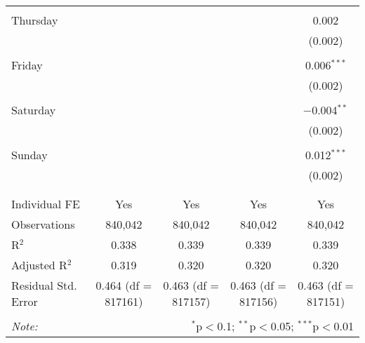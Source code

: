 \documentclass[
]{article}
\begin{document}
\begin{table}[!htbp]
{\begin{tabular}{@{\extracolsep{5pt}}lcccc}
  & & & & \\ 
 Thursday &  &  &  & 0.002 \\ 
  &  &  &  & (0.002) \\ 
  & & & & \\ 
 Friday &  &  &  & 0.006$^{***}$ \\ 
  &  &  &  & (0.002) \\ 
  & & & & \\ 
 Saturday &  &  &  & $-$0.004$^{**}$ \\ 
  &  &  &  & (0.002) \\ 
  & & & & \\ 
 Sunday &  &  &  & 0.012$^{***}$ \\ 
  &  &  &  & (0.002) \\ 
  & & & & \\ 
\hline \\[-1.8ex] 
Individual FE & Yes & Yes & Yes & Yes \\ 
Observations & 840,042 & 840,042 & 840,042 & 840,042 \\ 
R$^{2}$ & 0.338 & 0.339 & 0.339 & 0.339 \\ 
Adjusted R$^{2}$ & 0.319 & 0.320 & 0.320 & 0.320 \\ 
Residual Std. Error & 0.464 (df = 817161) & 0.463 (df = 817157) & 0.463 (df = 817156) & 0.463 (df = 817151) \\ 
\hline 
\hline \\[-1.8ex] 
\textit{Note:}  & \multicolumn{4}{r}{$^{*}$p$<$0.1; $^{**}$p$<$0.05; $^{***}$p$<$0.01} \\ 
\end{tabular}
} 
\end{table} 
\newpage
\end{document}
